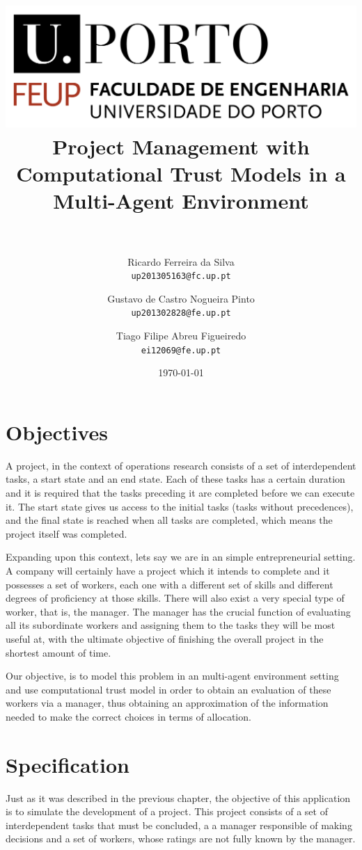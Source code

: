 \documentclass[paper=a4, fontsize=11pt]{scrartcl} %
\title
{	
\normalfont \normalsize 
\includegraphics[scale=0.7]{feup.png}
\horrule{0.5pt} \\[0.4cm] %
\huge Project Management with Computational Trust Models in a Multi-Agent Environment\\
\horrule{2pt} \\[0.5cm] %
}
\author{
	Ricardo Ferreira da Silva\\
	\texttt{up201305163@fc.up.pt}
	\and
	Gustavo de Castro Nogueira Pinto\\
	\texttt{up201302828@fe.up.pt}
	\and
	Tiago Filipe Abreu Figueiredo\\
	\texttt{ei12069@fe.up.pt}
}
\date{\normalsize\today} %
\numberwithin{equation}{section} %
\numberwithin{figure}{section} %
\numberwithin{table}{section} %
\begin{document}
\maketitle %

\newpage

\tableofcontents

\newpage
\section{Objectives}
A project, in the context of operations research consists of a set of interdependent tasks, a start state and an end state. Each of these tasks has a certain duration and it is required that the tasks preceding it are completed before we can execute it. The start state gives us access to the initial tasks (tasks without precedences), and the final state is reached when all tasks are completed, which means the project itself was completed.

Expanding upon this context, lets say we are in an simple entrepreneurial setting. A company will certainly have a project which it intends to complete and it possesses a set of workers, each one with a different set of skills and different degrees of proficiency at those skills. There will also exist a very special type of worker, that is, the manager. The manager has the crucial function of evaluating all its subordinate workers and assigning them to the tasks they will be most useful at, with the ultimate objective of finishing the overall project in the shortest amount of time.

Our objective, is to model this problem in an multi-agent environment setting and use computational trust model in order to obtain an evaluation of these workers via a manager, thus obtaining an approximation of the information needed to make the correct choices in terms of allocation.

\section{Specification}
Just as it was described in the previous chapter, the objective of this application is to simulate the development of a project. This project consists of a set of interdependent tasks that must be concluded, a a manager responsible of making decisions and a set of workers, whose ratings are not fully known by the manager.
\end{document}
